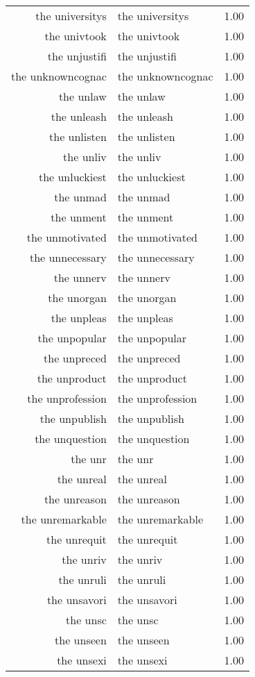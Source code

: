 \begin{table}[ht]
\begin{tabular}{rlr}
  the universitys & the universitys & 1.00 \\ 
  the univtook & the univtook & 1.00 \\ 
  the unjustifi & the unjustifi & 1.00 \\ 
  the unknowncognac & the unknowncognac & 1.00 \\ 
  the unlaw & the unlaw & 1.00 \\ 
  the unleash & the unleash & 1.00 \\ 
  the unlisten & the unlisten & 1.00 \\ 
  the unliv & the unliv & 1.00 \\ 
  the unluckiest & the unluckiest & 1.00 \\ 
  the unmad & the unmad & 1.00 \\ 
  the unment & the unment & 1.00 \\ 
  the unmotivated & the unmotivated & 1.00 \\ 
  the unnecessary & the unnecessary & 1.00 \\ 
  the unnerv & the unnerv & 1.00 \\ 
  the unorgan & the unorgan & 1.00 \\ 
  the unpleas & the unpleas & 1.00 \\ 
  the unpopular & the unpopular & 1.00 \\ 
  the unpreced & the unpreced & 1.00 \\ 
  the unproduct & the unproduct & 1.00 \\ 
  the unprofession & the unprofession & 1.00 \\ 
  the unpublish & the unpublish & 1.00 \\ 
  the unquestion & the unquestion & 1.00 \\ 
  the unr & the unr & 1.00 \\ 
  the unreal & the unreal & 1.00 \\ 
  the unreason & the unreason & 1.00 \\ 
  the unremarkable & the unremarkable & 1.00 \\ 
  the unrequit & the unrequit & 1.00 \\ 
  the unriv & the unriv & 1.00 \\ 
  the unruli & the unruli & 1.00 \\ 
  the unsavori & the unsavori & 1.00 \\ 
  the unsc & the unsc & 1.00 \\ 
  the unseen & the unseen & 1.00 \\ 
  the unsexi & the unsexi & 1.00 \\ 

\end{tabular}
\end{table}
